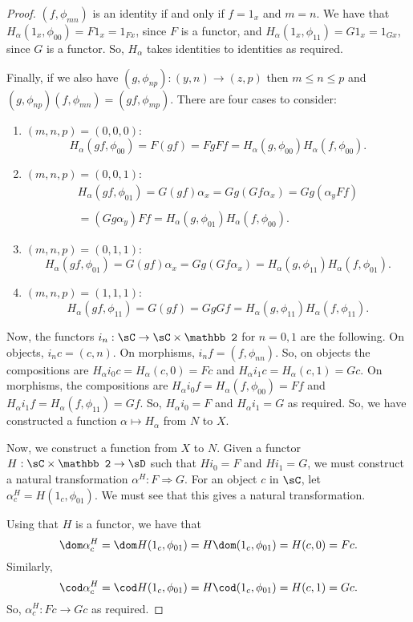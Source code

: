 \documentclass[main.tex]{subfiles}
\begin{document}
\begin{proof}
	$(f,\phi_{mn})$ is an identity if and only if $f=1_x$ and $m=n$. We have
	that $H_\alpha(1_x,\phi_{00})=F1_x=1_{Fx}$, since $F$ is a functor, and
	$H_\alpha(1_x,\phi_{11})=G1_x=1_{Gx}$, since $G$ is a functor. So,
	$H_\alpha$ takes identities to identities as required.

	Finally, if we also have $(g,\phi_{np}):(y,n)\rightarrow (z,p)$ then $m\le
	n\le p$ and $(g,\phi_{np})(f,\phi_{mn})=(gf,\phi_{mp})$. There are four
	cases to consider:
	\begin{enumerate}
		\item $(m,n,p)=(0,0,0)$:
			\[H_\alpha(gf,\phi_{00})=F(gf)=FgFf=H_\alpha(g,\phi_{00})H_\alpha(f,\phi_{00}).\]
		\item $(m,n,p)=(0,0,1)$:
			\[\begin{array}{l}H_\alpha(gf,\phi_{01})=G(gf)\alpha_x=Gg(Gf\alpha_x)=Gg(\alpha_yFf)\\ \\
					=(Gg\alpha_y)Ff=H_\alpha(g,\phi_{01})H_\alpha(f,\phi_{00}).
			\end{array}\]
		\item $(m,n,p)=(0,1,1)$:
			\[H_\alpha(gf,\phi_{01})=G(gf)\alpha_x=Gg(Gf\alpha_x)=H_\alpha(g,\phi_{11})H_\alpha(f,\phi_{01}).\]
		\item $(m,n,p)=(1,1,1)$:
			\[H_\alpha(gf,\phi_{11})=G(gf)=GgGf=H_\alpha(g,\phi_{11})H_\alpha(f,\phi_{11}).\]
	\end{enumerate}

	Now, the functors $i_n:\sC\rightarrow\sC\times\mathbb 2$ for $n=0,1$ are the
	following. On objects, $i_nc=(c,n)$. On morphisms, $i_nf=(f,\phi_{nn})$. So,
	on objects the compositions are $H_\alpha i_0c=H_\alpha (c,0)=Fc$ and
	$H_\alpha i_1c=H_\alpha (c,1)=Gc$. On morphisms, the compositions are
	$H_\alpha i_0f=H_\alpha (f,\phi_{00})=Ff$ and $H_\alpha i_1f=H_\alpha
	(f,\phi_{11})=Gf$. So, $H_\alpha i_0=F$ and $H_\alpha i_1=G$ as required.
	So, we have constructed a function $\alpha\mapsto H_\alpha$ from $N$ to $X$.

	Now, we construct a function from $X$ to $N$. Given a functor
	$H:\sC\times\mathbb 2\rightarrow\sD$ such that $Hi_0=F$ and $Hi_1=G$, we
	must construct a natural transformation $\alpha^H:F\Rightarrow G$. For an
	object $c$ in $\sC$, let $\alpha^H_c=H(1_c,\phi_{01})$. We must see that
	this gives a natural transformation.

	Using that $H$ is a functor, we have that
	\[\dom\alpha^H_c=\dom H(1_c,\phi_{01})=H\dom(1_c,\phi_{01})=H(c,0)=Fc.\]
	Similarly,
	\[\cod\alpha^H_c=\cod H(1_c,\phi_{01})=H\cod(1_c,\phi_{01})=H(c,1)=Gc.\]
	So, $\alpha^H_c:Fc\rightarrow Gc$ as required.


\end{proof}
\end{document}
